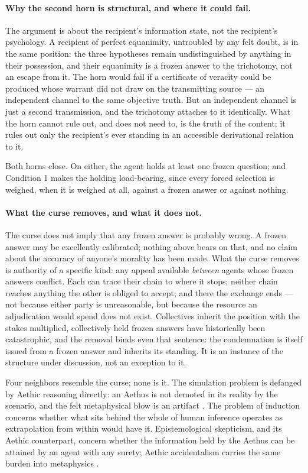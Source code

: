 \documentclass[11pt]{article}
\numberwithin{equation}{section}
\theoremstyle{plain}
\theoremstyle{definition}
\theoremstyle{remark}
\begin{document}
\paragraph{Why the second horn is structural, and where it could fail.}\label{ac:rem:structural}
The argument is about the recipient's information state, not the recipient's psychology. A recipient of perfect equanimity, untroubled by any felt doubt, is in the same position: the three hypotheses remain undistinguished by anything in their possession, and their equanimity is a frozen answer to the trichotomy, not an escape from it. The horn would fail if a certificate of veracity could be produced whose warrant did not draw on the transmitting source --- an independent channel to the same objective truth. But an independent channel is just a second transmission, and the trichotomy attaches to it identically. What the horn cannot rule out, and does not need to, is the truth of the content; it rules out only the recipient's ever standing in an accessible derivational relation to it.

Both horns close. On either, the agent holds at least one frozen question; and Condition 1 makes the holding load-bearing, since every forced selection is weighed, when it is weighed at all, against a frozen answer or against nothing.

\paragraph{What the curse removes, and what it does not.}\label{ac:rem:authority}
The curse does not imply that any frozen answer is probably wrong. A frozen answer may be excellently calibrated; nothing above bears on that, and no claim about the accuracy of anyone's morality has been made. What the curse removes is authority of a specific kind: any appeal available \emph{between} agents whose frozen answers conflict. Each can trace their chain to where it stops; neither chain reaches anything the other is obliged to accept; and there the exchange ends --- not because either party is unreasonable, but because the resource an adjudication would spend does not exist. Collectives inherit the position with the stakes multiplied, collectively held frozen answers have historically been catastrophic, and the removal binds even that sentence: the condemnation is itself issued from a frozen answer and inherits its standing. It is an instance of the structure under discussion, not an exception to it.

Four neighbors resemble the curse; none is it. The simulation problem is defanged by Aethic reasoning directly: an Aethus is not demoted in its reality by the scenario, and the felt metaphysical blow is an artifact \cite{Aethus}. The problem of induction concerns whether what sits behind the whole of human inference operates as extrapolation from within would have it. Epistemological skepticism, and its Aethic counterpart, concern whether the information held by the Aethus can be attained by an agent with any surety; Aethic accidentalism carries the same burden into metaphysics \cite{Aethus}.
\end{document}
